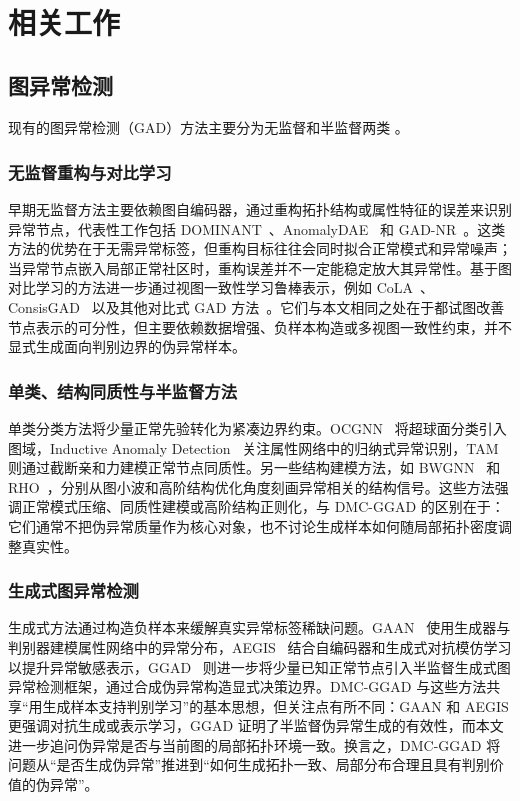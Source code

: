 ﻿﻿﻿﻿    \documentclass[conference, onecolumn]{IEEEtran}
\begin{document}
    \section{相关工作}
    \subsection{图异常检测}
    现有的图异常检测（GAD）方法主要分为无监督和半监督两类 \cite{ref_akoglu2015, ref_ma2021}。

    \subsubsection{无监督重构与对比学习}
    早期无监督方法主要依赖图自编码器，通过重构拓扑结构或属性特征的误差来识别异常节点，代表性工作包括 DOMINANT~\cite{ref_dominant}、AnomalyDAE~\cite{ref_anomalydae} 和 GAD-NR~\cite{ref_yang2023}。这类方法的优势在于无需异常标签，但重构目标往往会同时拟合正常模式和异常噪声；当异常节点嵌入局部正常社区时，重构误差并不一定能稳定放大其异常性。基于图对比学习的方法进一步通过视图一致性学习鲁棒表示，例如 CoLA~\cite{ref_cola2022}、ConsisGAD~\cite{ref_consisgad2024} 以及其他对比式 GAD 方法~\cite{ref_liu2021, ref_duan2023}。它们与本文相同之处在于都试图改善节点表示的可分性，但主要依赖数据增强、负样本构造或多视图一致性约束，并不显式生成面向判别边界的伪异常样本。

    \subsubsection{单类、结构同质性与半监督方法}
    单类分类方法将少量正常先验转化为紧凑边界约束。OCGNN~\cite{ref_ocgnn} 将超球面分类引入图域，Inductive Anomaly Detection~\cite{ref6} 关注属性网络中的归纳式异常识别，TAM~\cite{ref4} 则通过截断亲和力建模正常节点同质性。另一些结构建模方法，如 BWGNN~\cite{ref_bwgnn2022} 和 RHO~\cite{ref_rho2023}，分别从图小波和高阶结构优化角度刻画异常相关的结构信号。这些方法强调正常模式压缩、同质性建模或高阶结构正则化，与 DMC-GGAD 的区别在于：它们通常不把伪异常质量作为核心对象，也不讨论生成样本如何随局部拓扑密度调整真实性。

    \subsubsection{生成式图异常检测}
    生成式方法通过构造负样本来缓解真实异常标签稀缺问题。GAAN~\cite{ref_gaan} 使用生成器与判别器建模属性网络中的异常分布，AEGIS~\cite{ref_aegis} 结合自编码器和生成式对抗模仿学习以提升异常敏感表示，GGAD~\cite{ref7} 则进一步将少量已知正常节点引入半监督生成式图异常检测框架，通过合成伪异常构造显式决策边界。DMC-GGAD 与这些方法共享“用生成样本支持判别学习”的基本思想，但关注点有所不同：GAAN 和 AEGIS 更强调对抗生成或表示学习，GGAD 证明了半监督伪异常生成的有效性，而本文进一步追问伪异常是否与当前图的局部拓扑环境一致。换言之，DMC-GGAD 将问题从“是否生成伪异常”推进到“如何生成拓扑一致、局部分布合理且具有判别价值的伪异常”。
\end{document}
